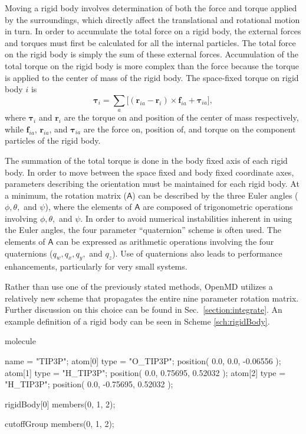 \documentclass[]{book}
\begin{document}
Moving a rigid body involves determination of both the force and
torque applied by the surroundings, which directly affect the
translational and rotational motion in turn. In order to accumulate
the total force on a rigid body, the external forces and torques must
first be calculated for all the internal particles. The total force on
the rigid body is simply the sum of these external forces.
Accumulation of the total torque on the rigid body is more complex
than the force because the torque is applied to the center of mass of
the rigid body. The space-fixed torque on rigid body $i$ is
\begin{equation}
\boldsymbol{\tau}_i=
	\sum_{a}\biggl[(\mathbf{r}_{ia}-\mathbf{r}_i)\times \mathbf{f}_{ia} 
	+ \boldsymbol{\tau}_{ia}\biggr],
\label{eq:torqueAccumulate}
\end{equation}
where $\boldsymbol{\tau}_i$ and $\mathbf{r}_i$ are the torque on and
position of the center of mass respectively, while $\mathbf{f}_{ia}$,
$\mathbf{r}_{ia}$, and $\boldsymbol{\tau}_{ia}$ are the force on,
position of, and torque on the component particles of the rigid body.

The summation of the total torque is done in the body fixed axis of
each rigid body. In order to move between the space fixed and body
fixed coordinate axes, parameters describing the orientation must be
maintained for each rigid body. At a minimum, the rotation matrix
($\mathsf{A}$) can be described by the three Euler angles ($\phi,
\theta,$ and $\psi$), where the elements of $\mathsf{A}$ are composed of
trigonometric operations involving $\phi, \theta,$ and
$\psi$.\cite{Goldstein01} In order to avoid numerical instabilities
inherent in using the Euler angles, the four parameter ``quaternion''
scheme is often used. The elements of $\mathsf{A}$ can be expressed as
arithmetic operations involving the four quaternions ($q_w, q_x, q_y,$
and $q_z$).\cite{Allen87} Use of quaternions also leads to
performance enhancements, particularly for very small
systems.\cite{Evans77}

Rather than use one of the previously stated methods, {\sc OpenMD}
utilizes a relatively new scheme that propagates the entire nine
parameter rotation matrix. Further discussion on this choice can be
found in Sec.~\ref{section:integrate}. An example definition of a
rigid body can be seen in Scheme
\ref{sch:rigidBody}.

\begin{code}[caption={[Defining rigid bodies]A sample
definition of a molecule containing a rigid body and a cutoff
group},label={sch:rigidBody}] 
molecule{
  name = "TIP3P";
  atom[0]{
    type = "O_TIP3P";
    position( 0.0, 0.0, -0.06556 );
  }
  atom[1]{
    type = "H_TIP3P";
    position( 0.0, 0.75695, 0.52032 );
  }
  atom[2]{
    type = "H_TIP3P";
    position( 0.0, -0.75695, 0.52032 );
  }

  rigidBody[0]{
    members(0, 1, 2);
  }

  cutoffGroup{
    members(0, 1, 2);
  }
}
\end{code}
\end{document}
